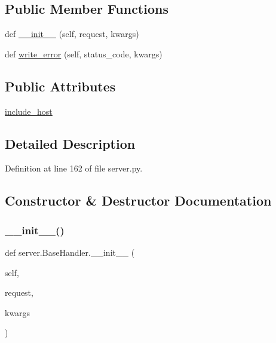 \subsection*{Public Member Functions}
\begin{DoxyCompactItemize}
\item 
def \hyperlink{classserver_1_1BaseHandler_a6a0ba1a057e8ca35920c149404fb1df0}{\+\_\+\+\_\+init\+\_\+\+\_\+} (self, request, kwargs)
\item 
def \hyperlink{classserver_1_1BaseHandler_a5f1d56408a328366fba10edc8ec94c40}{write\+\_\+error} (self, status\+\_\+code, kwargs)
\end{DoxyCompactItemize}
\subsection*{Public Attributes}
\begin{DoxyCompactItemize}
\item 
\hyperlink{classserver_1_1BaseHandler_a065e62fa6c6fa62f2cdddb6b47d1d1cf}{include\+\_\+host}
\end{DoxyCompactItemize}


\subsection{Detailed Description}


Definition at line 162 of file server.\+py.



\subsection{Constructor \& Destructor Documentation}
\mbox{\label{classserver_1_1BaseHandler_a6a0ba1a057e8ca35920c149404fb1df0}} 
\subsubsection{\texorpdfstring{\+\_\+\+\_\+init\+\_\+\+\_\+()}{\_\_init\_\_()}}
{\footnotesize\ttfamily def server.\+Base\+Handler.\+\_\+\+\_\+init\+\_\+\+\_\+ (\begin{DoxyParamCaption}\item[{}]{self,  }\item[{}]{request,  }\item[{}]{kwargs }\end{DoxyParamCaption})}



